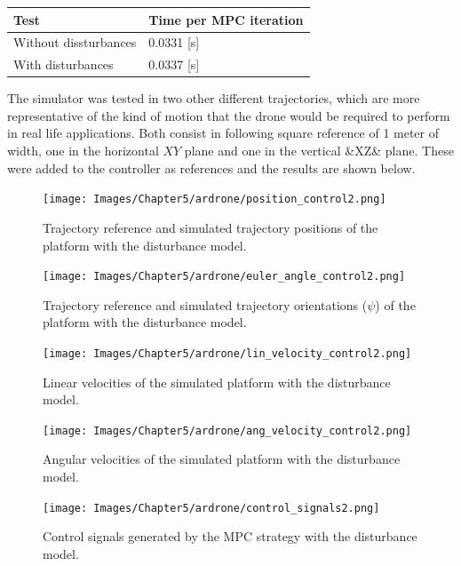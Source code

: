 \begin{center}
    \begin{tabular}{| l | l |}
    \hline
    \textbf{Test} & \textbf{Time per MPC iteration} \\ \hline
    Without dissturbances & 0.0331 [s]\\ \hline
    With disturbances &  0.0337 [s] \\
    \hline
    \end{tabular}
\end{center}

The simulator was tested in two other different trajectories, which are more representative of the kind of motion that the drone would be required to perform in real life applications. Both consist in following square reference of 1 meter of width, one in the horizontal $XY$ plane and one in the vertical &XZ& plane.  These were added to the controller as references and the results are shown below.

\begin{figure}[H]
\centering
\texttt{[image: Images/Chapter5/ardrone/position\_control2.png]}
\caption{Trajectory reference and simulated trajectory positions of the platform with the disturbance model.}
\label{fig:ardrone_pos3}
\end{figure}

\begin{figure}[H]
\centering
\texttt{[image: Images/Chapter5/ardrone/euler\_angle\_control2.png]}
\caption{Trajectory reference and simulated trajectory orientations ($\psi$) of the platform with the disturbance model.}
\label{fig:ardrone_ang3}
\end{figure}

\begin{figure}[H]    
\centering
\texttt{[image: Images/Chapter5/ardrone/lin\_velocity\_control2.png]}
\caption{Linear velocities of the simulated platform with the disturbance model. }
\label{fig:ardrone_lin_vel3}
\end{figure}

\begin{figure}[H]
\centering
\texttt{[image: Images/Chapter5/ardrone/ang\_velocity\_control2.png]}
\caption{Angular velocities of the simulated platform with the disturbance model.}
\label{fig:ardrone_ang_vel3}
\end{figure}

\begin{figure}[H]
\centering
\texttt{[image: Images/Chapter5/ardrone/control\_signals2.png]}
\caption{Control signals generated by the MPC strategy with the disturbance model.}
\label{fig:ardrone_inputs3}
\end{figure}

